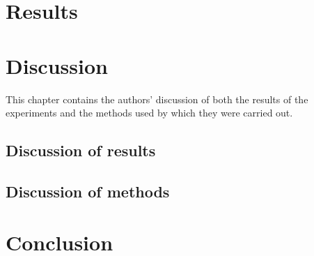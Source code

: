 \chapter{Results}


\chapter{Discussion}
This chapter contains the authors' discussion of both the results of the experiments and the methods used by which they were carried out.
\section{Discussion of results}


\section{Discussion of methods}


\chapter{Conclusion}




\newpage

\appendix
\addappheadtotoc


